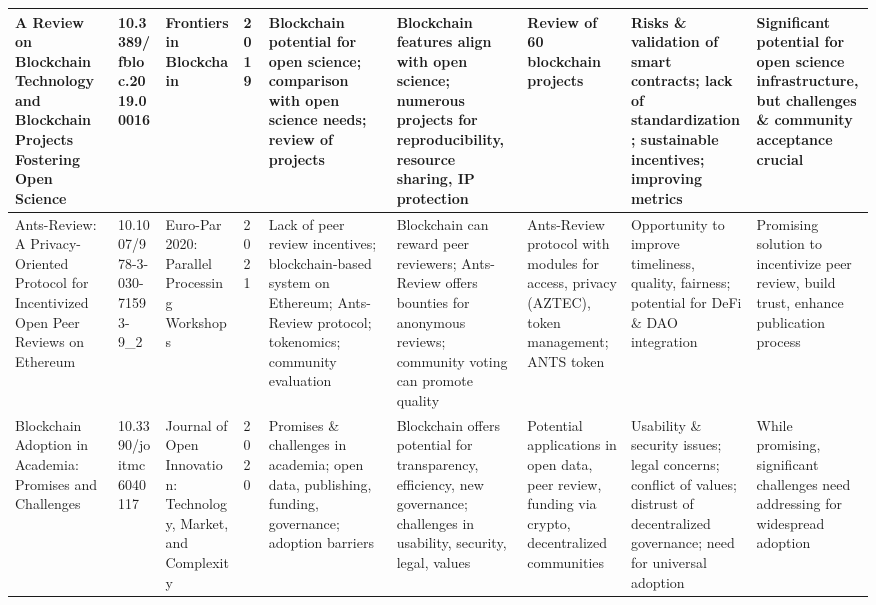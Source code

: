 \documentclass[final]{rc-book-2.14}
\begin{document}
\begin{landscape}
\begin{table}[ht]
\begin{tabularx}{\linewidth}{|p{3.5cm}|p{2.5cm}|p{3cm}|p{1.8cm}|X|X|X|X|X|}
            \hline
            A Review on Blockchain Technology and Blockchain Projects Fostering Open Science                                                   & 10.3389/fbloc.2019.00016      & Frontiers in Blockchain                                        & 2019                      & Blockchain potential for open science; comparison with open science needs; review of projects                               & Blockchain features align with open science; numerous projects for reproducibility, resource sharing, IP protection                            & Review of 60 blockchain projects                                                                        & Risks \& validation of smart contracts; lack of standardization; sustainable incentives; improving metrics                          & Significant potential for open science infrastructure, but challenges \& community acceptance crucial \\
            \hline
            Ants-Review: A Privacy-Oriented Protocol for Incentivized Open Peer Reviews on Ethereum                                            & 10.1007/978-3-030-71593-9\_2  & Euro-Par 2020: Parallel Processing Workshops                   & 2021                      & Lack of peer review incentives; blockchain-based system on Ethereum; Ants-Review protocol; tokenomics; community evaluation & Blockchain can reward peer reviewers; Ants-Review offers bounties for anonymous reviews; community voting can promote quality                  & Ants-Review protocol with modules for access, privacy (AZTEC), token management; ANTS token             & Opportunity to improve timeliness, quality, fairness; potential for DeFi \& DAO integration                                         & Promising solution to incentivize peer review, build trust, enhance publication process               \\
            \hline
            Blockchain Adoption in Academia: Promises and Challenges                                                                           & 10.3390/joitmc6040117         & Journal of Open Innovation: Technology, Market, and Complexity & 2020                      & Promises \& challenges in academia; open data, publishing, funding, governance; adoption barriers                           & Blockchain offers potential for transparency, efficiency, new governance; challenges in usability, security, legal, values                     & Potential applications in open data, peer review, funding via crypto, decentralized communities         & Usability \& security issues; legal concerns; conflict of values; distrust of decentralized governance; need for universal adoption & While promising, significant challenges need addressing for widespread adoption                       \\

\end{tabularx}
\end{table}
\end{landscape}
\end{document}
